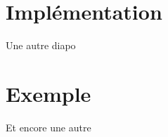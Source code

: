 \documentclass{beamer}
\begin{document}
\section{Impl\'ementation}%

\begin{frame}{Une autre diapo}
\lipsum[1]
\end{frame}


\section{Exemple}%

\begin{frame}{Et encore une autre}
\lipsum[1]
\end{frame}
\end{document}
